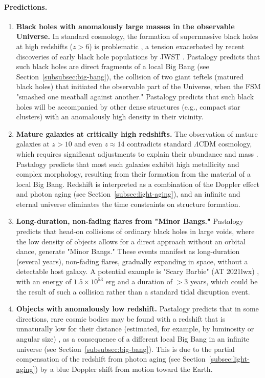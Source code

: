 \documentclass[pdflatex,sn-mathphys-num]{sn-jnl}
\begin{document}
\paragraph{Predictions.}
\begin{enumerate}
    \item \textbf{Black holes with anomalously large masses in the observable Universe.} In standard cosmology, the formation of supermassive black holes at high redshifts (\( z > 6 \)) is problematic \cite{larson2023-jwst-bh}, a tension exacerbated by recent discoveries of early black hole populations by JWST \cite{maiolino2024-jades-bh}. Pastalogy predicts that such black holes are direct fragments of a local Big Bang (see Section~\ref{subsubsec:big-bang}), the collision of two giant teftels (matured black holes) that initiated the observable part of the Universe, when the FSM "smashed one meatball against another." Pastalogy predicts that such black holes will be accompanied by other dense structures (e.g., compact star clusters) with an anomalously high density in their vicinity.    
    \item \textbf{Mature galaxies at critically high redshifts.} The observation of mature galaxies at \( z > 10 \) \cite{labbe2023-jwst-galaxies} and even \( z \approx 14 \) \cite{carniani2024-z14} contradicts standard \(\Lambda\)CDM cosmology, which requires significant adjustments to explain their abundance and mass \cite{lu2024-jwst-lcdm-tension}. Pastalogy predicts that most such galaxies exhibit high metallicity and complex morphology, resulting from their formation from the material of a local Big Bang. Redshift is interpreted as a combination of the Doppler effect and photon aging (see Section~\ref{subsec:light-aging}), and an infinite and eternal universe eliminates the time constraints on structure formation.
    \item \textbf{Long-duration, non-fading flares from "Minor Bangs."} Pastalogy predicts that head-on collisions of ordinary black holes in large voids, where the low density of objects allows for a direct approach without an orbital dance, generate "Minor Bangs." These events manifest as long-duration (several years), non-fading flares, gradually expanding in space, without a detectable host galaxy. A potential example is "Scary Barbie" (AT 2021lwx) \cite{subrayan2023-barbie}, with an energy of \( 1.5 \times 10^{53} \) erg and a duration of \( >3 \) years, which could be the result of such a collision rather than a standard tidal disruption event.
    \item \textbf{Objects with anomalously low redshift.} Pastalogy predicts that in some directions, rare cosmic bodies may be found with a redshift that is unnaturally low for their distance (estimated, for example, by luminosity or angular size) \cite{arp1987-quasars}, as a consequence of a different local Big Bang in an infinite universe (see Section~\ref{subsubsec:big-bang}). This is due to the partial compensation of the redshift from photon aging (see Section~\ref{subsec:light-aging}) by a blue Doppler shift from motion toward the Earth.
\end{enumerate}
 
\end{document}
